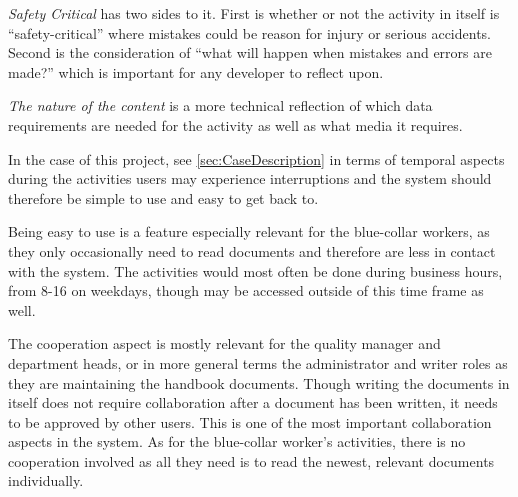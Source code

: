 \textit{Safety Critical} has two sides to it.
First is whether or not the activity in itself is ``safety-critical'' where mistakes could be reason for injury or serious accidents.
Second is the consideration of ``what will happen when mistakes and errors are made?'' which is important for any developer to reflect upon.

\textit{The nature of the content} is a more technical reflection of which data requirements are needed for the activity as well as what media it requires.


In the case of this project, see \cref{sec:CaseDescription} in terms of temporal aspects during the activities users may experience interruptions and the system should therefore be simple to use and easy to get back to.

Being easy to use is a feature especially relevant for the blue-collar workers, as they only occasionally need to read documents and therefore are less in contact with the system.
The activities would most often be done during business hours, from 8-16 on weekdays, though may be accessed outside of this time frame as well.

The cooperation aspect is mostly relevant for the  quality manager and department heads, or in more general terms the administrator and writer roles as they are maintaining the handbook documents.
Though writing the documents in itself does not require collaboration after a document has been written, it needs to be approved by other users.
This is one of the most important collaboration aspects in the system.
As for the blue-collar worker's activities, there is no cooperation involved as all they need is to read the newest, relevant documents individually.

